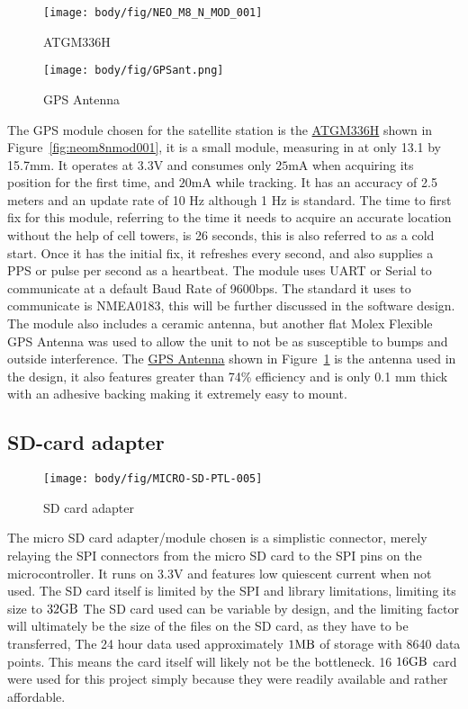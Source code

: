 \begin{figure}[!htb]
	\texttt{[image: body/fig/NEO\_M8\_N\_MOD\_001]}
	\caption{ATGM336H}
	\label{fig:neom8nmod001}
	\endminipage\hfill
	\texttt{[image: body/fig/GPSant.png]}
	\caption[GPS Antenna]{GPS Antenna}
	\label{fig:gps-1ant}
	\endminipage\hfill
\end{figure}
\noindent
The GPS module chosen for the satellite station is the \href{https://www.robotics.org.za/NEO-M8N-MOD}{ATGM336H} shown in Figure~\ref{fig:neom8nmod001}, it is a small module, measuring in at only 13.1 by 15.7mm. It operates at $3.3 \si{\volt}$ and consumes only $25 \si{\milli\ampere}$ when acquiring its position for the first time, and  $20 \si{\milli\ampere}$ while tracking. It has an accuracy of 2.5 meters and an update rate of 10 Hz although 1 Hz is standard. The time to first fix for this module, referring to the time it needs to acquire an accurate location without the help of cell towers, is 26 seconds, this is also referred to as a cold start. Once it has the initial fix, it refreshes every second, and also supplies a PPS or pulse per second as a heartbeat. The module uses UART or Serial to communicate at a default Baud Rate of 9600bps. The standard it uses to communicate is NMEA0183, this will be further discussed in the software design. The module also includes a ceramic antenna, but another flat Molex Flexible GPS Antenna was used to allow the unit to not be as susceptible to bumps and outside interference.
The \href{https://www.robotics.org.za/GPS-15246?search=antenna}{GPS Antenna} shown in Figure~\ref{fig:gps-1ant} is the antenna used in the design, it also features greater than 74\% efficiency and is only 0.1 mm thick with an adhesive backing making it extremely easy to mount.

\pagebreak
\subsection{SD-card adapter}
\begin{figure}[!htb]
	\centering
	\texttt{[image: body/fig/MICRO-SD-PTL-005]}
	\caption{SD card adapter}
	\label{fig:micro-sd-ptl-005}
\end{figure}

\noindent
The micro SD card adapter/module chosen is a simplistic connector, merely relaying the SPI connectors from the micro SD card to the SPI pins on the microcontroller. It runs on 3.3V and features low quiescent current when not used. The SD card itself is limited by the SPI and library limitations, limiting its size to $ 32 \si{\giga\byte} $ The SD card used can be variable by design, and the limiting factor will ultimately be the size of the files on the SD card, as they have to be transferred, The 24 hour data used approximately $ 1 \si{\mega\byte} $ of storage with 8640 data points. This means the card itself will likely not be the bottleneck. 16 $ 16 \si{\giga\byte} $ card were used for this project simply because they were readily available and rather affordable.





